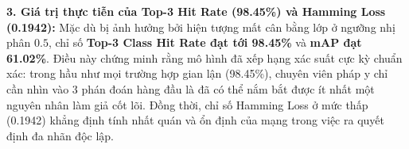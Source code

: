 \textbf{3. Giá trị thực tiễn của Top-3 Hit Rate (98.45\%) và Hamming Loss (0.1942):}
Mặc dù bị ảnh hưởng bởi hiện tượng mất cân bằng lớp ở ngưỡng nhị phân $0.5$, chỉ số \textbf{Top-3 Class Hit Rate đạt tới 98.45\%} và \textbf{mAP đạt 61.02\%}. Điều này chứng minh rằng mô hình đã xếp hạng xác suất cực kỳ chuẩn xác: trong hầu như mọi trường hợp gian lận (98.45\%), chuyên viên pháp y chỉ cần nhìn vào 3 phán đoán hàng đầu là đã có thể nắm bắt được ít nhất một nguyên nhân làm giả cốt lõi. Đồng thời, chỉ số Hamming Loss ở mức thấp (0.1942) khẳng định tính nhất quán và ổn định của mạng trong việc ra quyết định đa nhãn độc lập.
